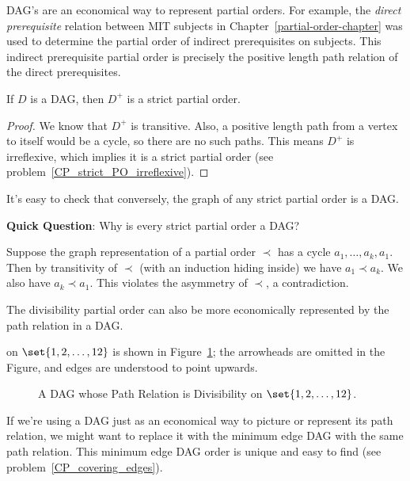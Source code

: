 DAG's are an economical way to represent partial orders.  For example, the
\emph{direct prerequisite} relation between MIT subjects in
Chapter~\ref{partial-order-chapter} was used to determine the partial
order of indirect prerequisites on subjects.  This indirect prerequisite
partial order is precisely the positive length path relation of the direct
prerequisites.

\begin{lemma}
If $D$ is a DAG, then $D^+$ is a strict partial order.
\end{lemma}

\begin{proof}
We know that $D^+$ is transitive.  Also, a positive length path from a
vertex to itself would be a cycle, so there are no such paths.  This means
$D^+$ is irreflexive, which implies it is a strict partial order (see
problem~\ref{CP_strict_PO_irreflexive}).
\end{proof}

It's easy to check that conversely, the graph of any strict partial order
is a DAG.

\textbf{Quick Question}:  Why is every strict partial order a DAG?

\begin{solution}
Suppose the graph representation of a partial order $\prec$ has a cycle
$a_1,\dots,a_k,a_1$.  Then by transitivity of $\prec$ (with an induction
hiding inside) we have $a_1 \prec a_k$.  We also have $a_k \prec a_1$.
This violates the asymmetry of $\prec$, a contradiction.
\end{solution}

The divisibility partial order can also be more economically represented by
the path relation in a DAG.   on $\set{1,2,\dots,12}$ is shown in
Figure~\ref{fig:divisibility-DAG}; the arrowheads are omitted in the
Figure, and edges are understood to point upwards.

\begin{figure}[h]
\begin{center}

\end{center}
\caption{A DAG whose Path Relation is Divisibility on $\set{1,2,\dots,12}$.}
\label{fig:divisibility-DAG}
\end{figure}

If we're using a DAG just as an economical way to picture or represent its
path relation, we might want to replace it with the minimum edge DAG with
the same path relation.  This minimum edge DAG order is unique and easy to
find (see problem~\ref{CP_covering_edges}).

\begin{problems}
\classproblems
{}

\homeworkproblems
{}
\end{problems}

\endinput

